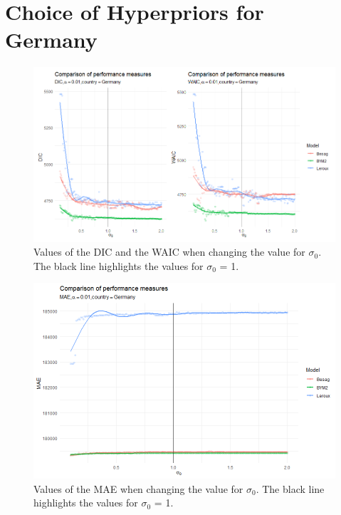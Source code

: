 \section{Choice of Hyperpriors for Germany}
\begin{figure}[H]
    \centering
    \includegraphics[width = \textwidth]{comparison_1_germany.png}
    \caption{Values of the DIC and the WAIC when changing the value for $\sigma_0$. The black line highlights the values for $\sigma_0$ = 1.}
    \label{comparison_germany_1}
\end{figure}
\begin{figure}[H]
    \centering
    \includegraphics[width = \textwidth]{mae_germany.png}
    \caption{Values of the MAE when changing the value for $\sigma_0$. The black line highlights the values for $\sigma_0$ = 1.}
    \label{comparison_germany_2}
\end{figure}
